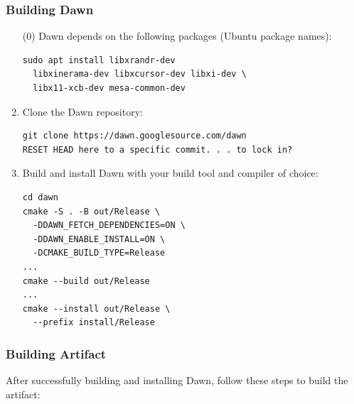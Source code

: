 \documentclass[sigconf]{acmart}
\begin{document}
\subsubsection{Building Dawn}
\begin{enumerate}
  \item[(0)] Dawn depends on the following packages (Ubuntu package names):
        \begin{lstlisting}[basicstyle=\ttfamily\small, frame=single]
sudo apt install libxrandr-dev
  libxinerama-dev libxcursor-dev libxi-dev \
  libx11-xcb-dev mesa-common-dev
  \end{lstlisting}

  \item Clone the Dawn repository:
        \begin{lstlisting}[basicstyle=\ttfamily\small, frame=single]
git clone https://dawn.googlesource.com/dawn
RESET HEAD here to a specific commit. . . to lock in?
  \end{lstlisting}

  \item Build and install Dawn with your build tool and compiler of choice:
        \begin{lstlisting}[basicstyle=\ttfamily\small, frame=single]
cd dawn
cmake -S . -B out/Release \
  -DDAWN_FETCH_DEPENDENCIES=ON \
  -DDAWN_ENABLE_INSTALL=ON \
  -DCMAKE_BUILD_TYPE=Release
...
cmake --build out/Release
...
cmake --install out/Release \
  --prefix install/Release
  \end{lstlisting}
\end{enumerate}

\subsubsection{Building Artifact}
After successfully building and installing Dawn, follow these steps to build the artifact:
\end{document}
